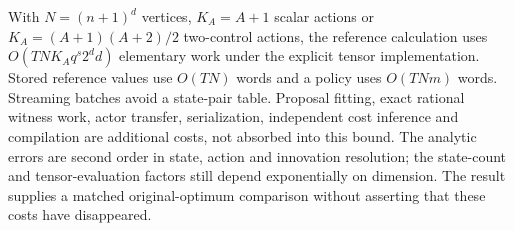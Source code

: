 With $N=(n+1)^d$ vertices, $K_A=A+1$ scalar actions or $K_A=(A+1)(A+2)/2$ two-control actions, the reference calculation uses $O(TNK_Aq^s2^d d)$ elementary work under the explicit tensor implementation. Stored reference values use $O(TN)$ words and a policy uses $O(TNm)$ words. Streaming batches avoid a state-pair table. Proposal fitting, exact rational witness work, actor transfer, serialization, independent cost inference and compilation are additional costs, not absorbed into this bound. The analytic errors are second order in state, action and innovation resolution; the state-count and tensor-evaluation factors still depend exponentially on dimension. The result supplies a matched original-optimum comparison without asserting that these costs have disappeared.
